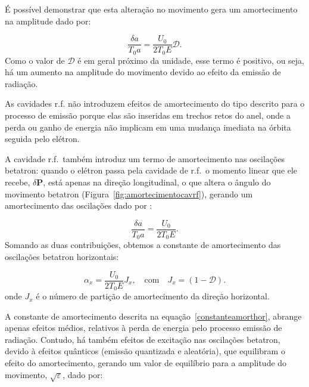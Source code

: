 É possível demonstrar que esta alteração no movimento gera um amortecimento na amplitude dado por:

\begin{equation}
 \frac{\delta a}{T_0a} = \frac{U_0}{2T_0 E}\mathcal{D}.
\end{equation}
Como o valor de $\mathcal{D}$ é em geral próximo da unidade, esse termo é positivo, ou seja, há um aumento na amplitude do movimento devido ao efeito da emissão de radiação.


As cavidades r.f. não introduzem efeitos de amortecimento do tipo descrito para o processo de emissão porque elas são inseridas em trechos retos do anel, onde a perda ou ganho de energia não implicam em uma mudança imediata na órbita seguida pelo elétron.

A cavidade r.f.~também introduz um termo de amortecimento nas oscilações betatron: quando o elétron passa pela cavidade de r.f.~o momento linear que ele recebe, $\delta \textbf{P}$, está apenas na direção longitudinal, o que altera o ângulo do movimento betatron \mbox{(Figura \ref{fig:amortecimentocavrf})}, gerando um amortecimento das oscilações dado por \cite{Sands}:

\begin{equation}
  \frac{\delta a}{T_0a} = \frac{U_0}{2T_0 E}.
\end{equation}
Somando as duas contribuições, obtemos a constante de amortecimento das oscilações betatron horizontais:

\begin{equation}\label{constanteamorthor}
\alpha_x =  \frac{U_0}{2T_0 E}J_x , \quad \text{com} \quad J_x =(1-\mathcal{D}).
\end{equation}
onde $J_x$ é o número de partição de amortecimento da direção horizontal.

A constante de amortecimento descrita na \mbox{equação \ref{constanteamorthor}}, abrange apenas efeitos médios, relativos à perda de energia pelo processo emissão de radiação. Contudo, há também efeitos de excitação nas oscilações betatron, devido à efeitos quânticos (emissão quantizada e aleatória), que equilibram o efeito do amortecimento, gerando um valor de equilíbrio para a amplitude do movimento, $\sqrt{\varepsilon}$, dado por:


